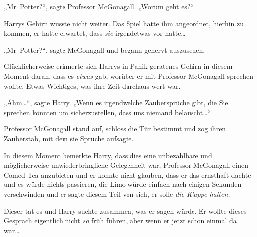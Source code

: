 „Mr~Potter?“, sagte Professor McGonagall. „Worum geht es?“

Harrys Gehirn wusste nicht weiter. Das Spiel hatte ihm angeordnet, hierhin zu kommen, er hatte erwartet, dass \emph{sie} irgendetwas vor hatte…

„Mr~Potter?“, sagte McGonagall und begann genervt auszusehen.

Glücklicherweise erinnerte sich Harrys in Panik geratenes Gehirn in diesem Moment daran, dass es \emph{etwas} gab, worüber er mit Professor McGonagall sprechen wollte. Etwas Wichtiges, was ihre Zeit durchaus wert war.

„Ähm…“, sagte Harry. „Wenn es irgendwelche Zaubersprüche gibt, die Sie sprechen könnten um sicherzustellen, dass uns niemand belauscht…“

Professor McGonagall stand auf, schloss die Tür bestimmt und zog ihren Zauberstab, mit dem sie Sprüche aufsagte.

In diesem Moment bemerkte Harry, dass dies eine unbezahlbare und möglicherweise unwiederbringliche Gelegenheit war, Professor McGonagall einen Comed-Tea anzubieten und er konnte nicht glauben, dass er das ernsthaft dachte und es würde nichts passieren, die Limo würde einfach nach einigen Sekunden verschwinden und er sagte diesem Teil von sich, er solle \emph{die Klappe halten.}

Dieser tat es und Harry suchte zusammen, was er sagen würde. Er wollte dieses Gespräch eigentlich nicht \emph{so} früh führen, aber wenn er jetzt schon einmal da war…

